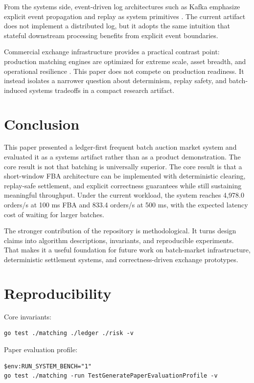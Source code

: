 \documentclass[11pt]{article}
\begin{document}
From the systems side, event-driven log architectures such as Kafka emphasize explicit event propagation and replay as system primitives \citep{kafka2011}. The current artifact does not implement a distributed log, but it adopts the same intuition that stateful downstream processing benefits from explicit event boundaries.

Commercial exchange infrastructure provides a practical contrast point: production matching engines are optimized for extreme scale, asset breadth, and operational resilience \citep{nasdaqmatching}. This paper does not compete on production readiness. It instead isolates a narrower question about determinism, replay safety, and batch-induced systems tradeoffs in a compact research artifact.

\section{Conclusion}

This paper presented a ledger-first frequent batch auction market system and evaluated it as a systems artifact rather than as a product demonstration. The core result is not that batching is universally superior. The core result is that a short-window FBA architecture can be implemented with deterministic clearing, replay-safe settlement, and explicit correctness guarantees while still sustaining meaningful throughput. Under the current workload, the system reaches 4{,}978.0 orders/s at 100 ms FBA and 833.4 orders/s at 500 ms, with the expected latency cost of waiting for larger batches.

The stronger contribution of the repository is methodological. It turns design claims into algorithm descriptions, invariants, and reproducible experiments. That makes it a useful foundation for future work on batch-market infrastructure, deterministic settlement systems, and correctness-driven exchange prototypes.

\appendix
\section{Reproducibility}

Core invariants:

\begin{verbatim}
go test ./matching ./ledger ./risk -v
\end{verbatim}

Paper evaluation profile:

\begin{verbatim}
$env:RUN_SYSTEM_BENCH="1"
go test ./matching -run TestGeneratePaperEvaluationProfile -v
\end{verbatim}
\end{document}
